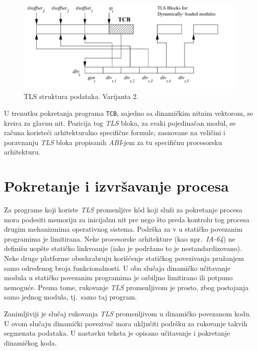 \documentclass[12pt,oneside]{memoir}
\begin{document}
\begin{figure}[h!]
	\begin{center}
		\includegraphics[scale=0.6]{slike/TLSmodelV2.png}
	\end{center}
	\caption{TLS struktura podataka. Varijanta 2.}
	\label{fig:tls_model2}
\end{figure}

U trenutku pokretanja programa \texttt{TCB}, zajedno sa dinamičkim nitnim vektorom, se kreira za glavnu nit. Pozicija tog \emph{TLS} bloka, za svaki pojedinačan modul, se računa koristeći arhitekturalno specifične formule, zasnovane na veličini i poravnanju \emph{TLS} bloka propisanih \emph{ABI}-jem za tu specifičnu procesorsku arhitekturu.

\section{Pokretanje i izvršavanje procesa}

Za programe koji koriste \emph{TLS} promenljive k\^{o}d koji služi za pokretanje procesa mora podesiti memoriju za inicijalnu nit pre nego što preda kontrolu tog procesa drugim mehanizmima operativnog sistema. Podrška za v u statičko povezanim programima je limitirana. Neke procesorske arhitekture (kao npr.~\emph{IA-64}) ne definišu uopšte statičko linkvoanje (iako je podržano to je nestandardizovano). Neke druge platforme obeshrabruju korišćenje statičkog povezivanja pružanjem samo određenog broja funkcionalnosti. U oba slučaja dinamičko učitavanje modula u statičko povezanim programima je ozbiljno limitirano ili potpuno nemoguće. Prema tome, rukovanje \emph{TLS} promenljivom je prosto, zbog postojanja samo jednog modula, tj.~samo taj program.

Zanimljiviji je slučaj rukovanja \emph{TLS} promenljivom u dinamičko povezanom kodu. U ovom slučaju dinamički povezivač mora uključiti podršku za rukovanje takvih segmenata podataka. U nastavku teksta je opisano učitavanje i pokretanje dinamičkog koda.
\end{document}
